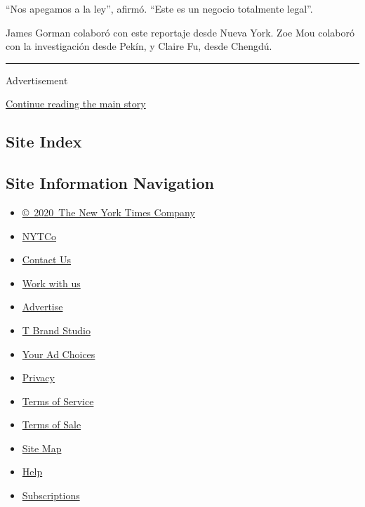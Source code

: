 ``Nos apegamos a la ley'', afirmó. ``Este es un negocio totalmente
legal''.

James Gorman colaboró con este reportaje desde Nueva York. Zoe Mou
colaboró con la investigación desde Pekín, y Claire Fu, desde Chengdú.

\begin{center}\rule{0.5\linewidth}{\linethickness}\end{center}

Advertisement

\protect\hyperlink{after-bottom}{Continue reading the main story}

\hypertarget{site-index}{%
\subsection{Site Index}\label{site-index}}

\hypertarget{site-information-navigation}{%
\subsection{Site Information
Navigation}\label{site-information-navigation}}

\begin{itemize}
\tightlist
\item
  \href{https://help.nytimes.com/hc/en-us/articles/115014792127-Copyright-notice}{©~2020~The
  New York Times Company}
\end{itemize}

\begin{itemize}
\tightlist
\item
  \href{https://www.nytco.com/}{NYTCo}
\item
  \href{https://help.nytimes.com/hc/en-us/articles/115015385887-Contact-Us}{Contact
  Us}
\item
  \href{https://www.nytco.com/careers/}{Work with us}
\item
  \href{https://nytmediakit.com/}{Advertise}
\item
  \href{http://www.tbrandstudio.com/}{T Brand Studio}
\item
  \href{https://www.nytimes.com/privacy/cookie-policy\#how-do-i-manage-trackers}{Your
  Ad Choices}
\item
  \href{https://www.nytimes.com/privacy}{Privacy}
\item
  \href{https://help.nytimes.com/hc/en-us/articles/115014893428-Terms-of-service}{Terms
  of Service}
\item
  \href{https://help.nytimes.com/hc/en-us/articles/115014893968-Terms-of-sale}{Terms
  of Sale}
\item
  \href{https://spiderbites.nytimes.com}{Site Map}
\item
  \href{https://help.nytimes.com/hc/en-us}{Help}
\item
  \href{https://www.nytimes.com/subscription?campaignId=37WXW}{Subscriptions}
\end{itemize}
